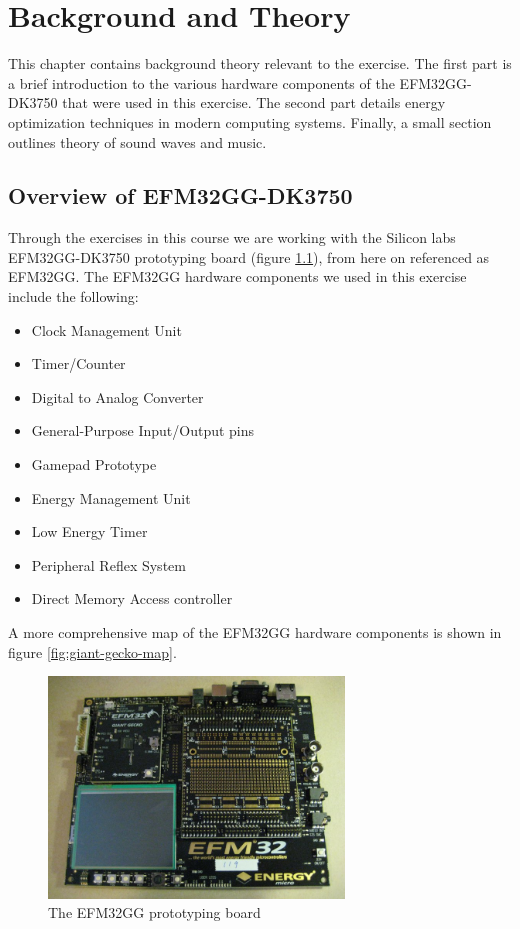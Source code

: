 \chapter{Background and Theory}
This chapter contains background theory relevant to the exercise. The first part is a brief introduction to the various hardware components of the EFM32GG-DK3750 that were used in this exercise. The second part details energy optimization techniques in modern computing systems. Finally, a small section outlines theory of sound waves and music.

\section{Overview of EFM32GG-DK3750}
Through the exercises in this course we are working with the Silicon labs EFM32GG-DK3750 prototyping board (figure \ref{fig:efm-board}), from here on referenced as EFM32GG. The EFM32GG hardware components we used in this exercise include the following:
\begin{itemize}
	\item Clock Management Unit
	\item Timer/Counter
	\item Digital to Analog Converter
	\item General-Purpose Input/Output pins
	\item Gamepad Prototype
	\item Energy Management Unit
  \item Low Energy Timer
  \item Peripheral Reflex System
	\item Direct Memory Access controller
\end{itemize}
A more comprehensive map of the EFM32GG hardware components is shown in figure \ref{fig:giant-gecko-map}.

\begin{figure}[H]
  \centering
  \includegraphics[width=0.7\textwidth]{images/efm_board.jpg}
  \caption{The EFM32GG prototyping board}\label{fig:efm-board}
\end{figure}

